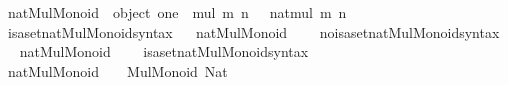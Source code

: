 \begin{isabellebody}
\isamarkupfalse%
%
\endisatagproof
{\isafoldproof}%
%
\isadelimproof
\isanewline
%
\endisadelimproof
\isanewline
{}\isamarkupfalse%
\ {\isachardoublequoteopen}nat{\isacharunderscore}{\kern0pt}Mul{\isacharunderscore}{\kern0pt}Monoid\ {\isasymequiv}\ object\ {\isacharbraceleft}{\kern0pt}{\isasymlangle}{\isacharat}{\kern0pt}one{\isacharcomma}{\kern0pt}\ {}{\isasymrangle}{\isacharcomma}{\kern0pt}\ {\isasymlangle}{\isacharat}{\kern0pt}mul{\isacharcomma}{\kern0pt}\ {\isasymlambda}m\ n\ {\isasymin}\ {\isasymnat}{\isachardot}{\kern0pt}\ nat{\isacharunderscore}{\kern0pt}mul\ m\ n{\isasymrangle}{\isacharbraceright}{\kern0pt}{\isachardoublequoteclose}\isanewline
\isanewline
{}\isamarkupfalse%
\ isa{\isacharunderscore}{\kern0pt}set{\isacharunderscore}{\kern0pt}nat{\isacharunderscore}{\kern0pt}Mul{\isacharunderscore}{\kern0pt}Monoid{\isacharunderscore}{\kern0pt}syntax\isanewline
{}\ \isamarkupfalse%
\ nat{\isacharunderscore}{\kern0pt}Mul{\isacharunderscore}{\kern0pt}Monoid\ {\isacharparenleft}{\kern0pt}{\isachardoublequoteopen}{\isacharprime}{\kern0pt}{\isacharparenleft}{\kern0pt}{\isasymnat}{\isacharcomma}{\kern0pt}\ {\isacharasterisk}{\kern0pt}{\isacharprime}{\kern0pt}{\isacharparenright}{\kern0pt}{\isachardoublequoteclose}{\isacharparenright}{\kern0pt}\ \isamarkupfalse%
\isanewline
{}\isamarkupfalse%
\ no{\isacharunderscore}{\kern0pt}isa{\isacharunderscore}{\kern0pt}set{\isacharunderscore}{\kern0pt}nat{\isacharunderscore}{\kern0pt}Mul{\isacharunderscore}{\kern0pt}Monoid{\isacharunderscore}{\kern0pt}syntax\isanewline
{}\ \isamarkupfalse%
\ nat{\isacharunderscore}{\kern0pt}Mul{\isacharunderscore}{\kern0pt}Monoid\ {\isacharparenleft}{\kern0pt}{\isachardoublequoteopen}{\isacharprime}{\kern0pt}{\isacharparenleft}{\kern0pt}{\isasymnat}{\isacharcomma}{\kern0pt}\ {\isacharasterisk}{\kern0pt}{\isacharprime}{\kern0pt}{\isacharparenright}{\kern0pt}{\isachardoublequoteclose}{\isacharparenright}{\kern0pt}\ \isamarkupfalse%
\isanewline
\isanewline
{}\isamarkupfalse%
\ isa{\isacharunderscore}{\kern0pt}set{\isacharunderscore}{\kern0pt}nat{\isacharunderscore}{\kern0pt}Mul{\isacharunderscore}{\kern0pt}Monoid{\isacharunderscore}{\kern0pt}syntax\isanewline
\isanewline
{}\isamarkupfalse%
\ nat{\isacharunderscore}{\kern0pt}Mul{\isacharunderscore}{\kern0pt}Monoid{\isacharcolon}{\kern0pt}\ {\isachardoublequoteopen}{\isacharparenleft}{\kern0pt}{\isasymnat}{\isacharcomma}{\kern0pt}\ {\isacharasterisk}{\kern0pt}{\isacharparenright}{\kern0pt}\ {\isacharcolon}{\kern0pt}\ Mul{\isacharunderscore}{\kern0pt}Monoid\ Nat{\isachardoublequoteclose}\isanewline

\end{isabellebody}
